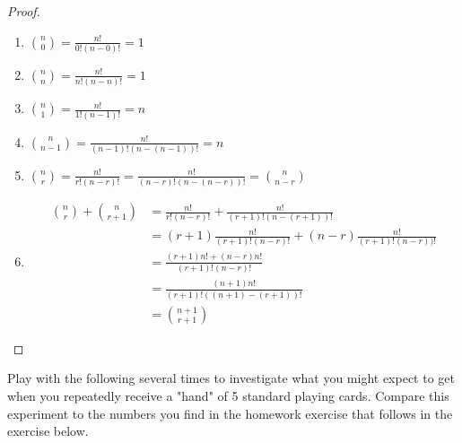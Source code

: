 \documentclass[10pt,]{book}
\theoremstyle{plain}
\theoremstyle{definition}
\theoremstyle{definition}
\theoremstyle{definition}
\numberwithin{equation}{section}
\begin{document}
\begin{proof}\hypertarget{proof-10}{}

	\leavevmode%
\begin{enumerate}
\item\hypertarget{li-108}{}\(\binom{n}{0} = \frac{n!}{0!(n-0)!} = 1\)%
\item\hypertarget{li-109}{}\(\binom{n}{n} = \frac{n!}{n!(n-n)!} = 1\)%
\item\hypertarget{li-110}{}\(\binom{n}{1} = \frac{n!}{1!(n-1)!} = n\)%
\item\hypertarget{li-111}{}\(\binom{n}{n-1} = \frac{n!}{(n-1)!(n-(n-1))!} = n\)%
\item\hypertarget{li-112}{}\(\binom{n}{r} = \frac{n!}{r!(n-r)!} = \frac{n!}{(n-r)!(n-(n-r))!} = \binom{n}{n-r}\)%
\item\hypertarget{li-113}{}
		\begin{align*}
\binom{n}{r} + \binom{n}{r+1} & = \frac{n!}{r!(n-r)!} + \frac{n!}{(r+1)!(n-(r+1))!}\\
 & = (r+1) \frac{n!}{(r+1)!(n-r)!} + (n-r) \frac{n!}{(r+1)!(n-r))!}\\
 & = \frac{(r+1) n! + (n-r)n!}{(r+1)!(n-r)!}\\
 & = \frac{(n+1) n!}{(r+1)!((n+1)-(r+1))!}\\
 & = \binom{n+1}{r+1}
\end{align*}
\end{enumerate}

\end{proof}
\par
Play with the following several times to investigate what you might expect to get when you repeatedly receive a "hand" of 5 standard playing cards. Compare this experiment to the numbers you find in the homework exercise that follows in the exercise below.
%
\end{document}
